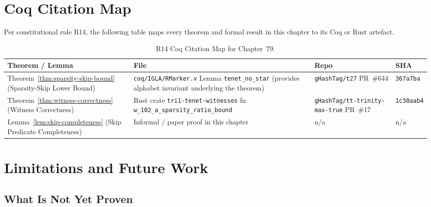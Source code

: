 \section{Coq Citation Map}
\label{sec:ch79-coq-citation-map}

Per constitutional rule R14, the following table maps every theorem
and formal result in this chapter to its Coq or Rust artefact.

\begin{table}[htbp]
  \centering
  \caption{R14 Coq Citation Map for Chapter~79.}
  \label{tab:coq-citation-map}
  \begin{tabular}{p{4.5cm}p{5cm}ll}
    \toprule
    \textbf{Theorem / Lemma} & \textbf{File} & \textbf{Repo} & \textbf{SHA} \\
    \midrule
    Theorem~\ref{thm:sparsity-skip-bound}
      (Sparsity-Skip Lower Bound)
      & \texttt{coq/IGLA/RMarker.v}
        \newline Lemma \texttt{tenet\_no\_star}
        \newline (provides alphabet invariant
        underlying the theorem)
      & \texttt{gHashTag/t27}
        \newline PR~\#644
      & \texttt{367a7ba} \\
    \midrule
    Theorem~\ref{thm:witness-correctness}
      (Witness Correctness)
      & Rust crate
        \texttt{tri1-tenet-witnesses}
        \newline fn \texttt{w\_102\_a\_sparsity\_ratio\_bound}
      & \texttt{gHashTag/tt-trinity-max-true}
        \newline PR~\#17
      & \texttt{1c30aab4} \\
    \midrule
    Lemma~\ref{lem:skip-completeness}
      (Skip Predicate Completeness)
      & Informal / paper proof
        in this chapter
      & n/a
      & n/a \\
    \bottomrule
  \end{tabular}
\end{table}

\section{Limitations and Future Work}
\label{sec:ch79-limitations}

\subsection{What Is Not Yet Proven}
\label{subsec:ch79-not-proven}

